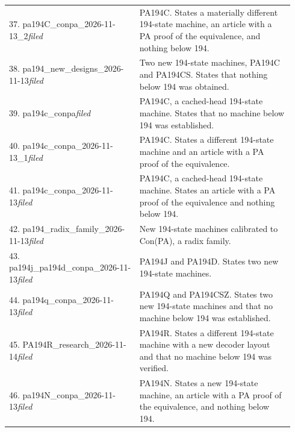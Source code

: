 \begin{longtable}{@{}p{0.43\linewidth}p{0.51\linewidth}@{}}
37. pa194C\_\allowbreak{}conpa\_\allowbreak{}2026-11-13\_\allowbreak{}2\newline\emph{filed} & PA194C. States a materially different 194-state machine, an article with a PA proof of the equivalence, and nothing below 194.\\[5pt]
38. pa194\_\allowbreak{}new\_\allowbreak{}designs\_\allowbreak{}2026-11-13\newline\emph{filed} & Two new 194-state machines, PA194C and PA194CS. States that nothing below 194 was obtained.\\[5pt]
39. pa194c\_\allowbreak{}conpa\newline\emph{filed} & PA194C, a cached-head 194-state machine. States that no machine below 194 was established.\\[5pt]
40. pa194c\_\allowbreak{}conpa\_\allowbreak{}2026-11-13\_\allowbreak{}1\newline\emph{filed} & PA194C. States a different 194-state machine and an article with a PA proof of the equivalence.\\[5pt]
41. pa194c\_\allowbreak{}conpa\_\allowbreak{}2026-11-13\newline\emph{filed} & PA194C, a cached-head 194-state machine. States an article with a PA proof of the equivalence and nothing below 194.\\[5pt]
42. pa194\_\allowbreak{}radix\_\allowbreak{}family\_\allowbreak{}2026-11-13\newline\emph{filed} & New 194-state machines calibrated to Con(PA), a radix family.\\[5pt]
43. pa194j\_\allowbreak{}pa194d\_\allowbreak{}conpa\_\allowbreak{}2026-11-13\newline\emph{filed} & PA194J and PA194D. States two new 194-state machines.\\[5pt]
44. pa194q\_\allowbreak{}conpa\_\allowbreak{}2026-11-13\newline\emph{filed} & PA194Q and PA194CSZ. States two new 194-state machines and that no machine below 194 was established.\\[5pt]
45. PA194R\_\allowbreak{}research\_\allowbreak{}2026-11-14\newline\emph{filed} & PA194R. States a different 194-state machine with a new decoder layout and that no machine below 194 was verified.\\[5pt]
46. pa194N\_\allowbreak{}conpa\_\allowbreak{}2026-11-13\newline\emph{filed} & PA194N. States a new 194-state machine, an article with a PA proof of the equivalence, and nothing below 194.\\[5pt]

\end{longtable}

